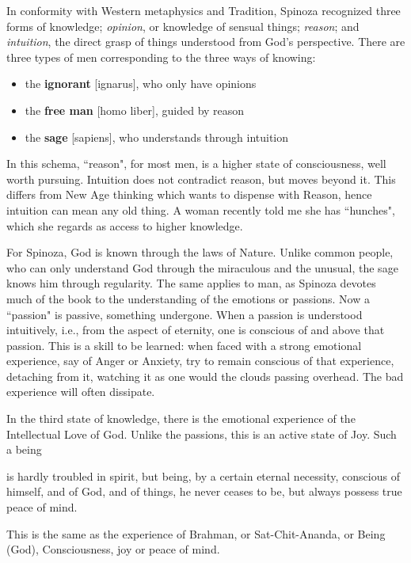 In conformity with Western metaphysics and Tradition, Spinoza recognized three forms of knowledge; \emph{opinion}, or knowledge of sensual things; \emph{reason}; and \emph{intuition}, the direct grasp of things understood from God's perspective. There are three types of men corresponding to the three ways of knowing:

\begin{itemize}
\item the \textbf{ignorant }[ignarus], who only have opinions 
\item the \textbf{free man} [homo liber], guided by reason 
\item the \textbf{sage} [sapiens], who understands through intuition 
\end{itemize}
In this schema, ``reason", for most men, is a higher state of consciousness, well worth pursuing. Intuition does not contradict reason, but moves beyond it. This differs from New Age thinking which wants to dispense with Reason, hence intuition can mean any old thing. A woman recently told me she has ``hunches", which she regards as access to higher knowledge.

For Spinoza, God is known through the laws of Nature. Unlike common people, who can only understand God through the miraculous and the unusual, the sage knows him through regularity. The same applies to man, as Spinoza devotes much of the book to the understanding of the emotions or passions. Now a ``passion" is passive, something undergone. When a passion is understood intuitively, i.e., from the aspect of eternity, one is conscious of and above that passion. This is a skill to be learned: when faced with a strong emotional experience, say of Anger or Anxiety, try to remain conscious of that experience, detaching from it, watching it as one would the clouds passing overhead. The bad experience will often dissipate.

In the third state of knowledge, there is the emotional experience of the Intellectual Love of God. Unlike the passions, this is an active state of Joy. Such a being

\begin{quotex}
is hardly troubled in spirit, but being, by a certain eternal necessity, conscious of himself, and of God, and of things, he never ceases to be, but always possess true peace of mind.

\end{quotex}
This is the same as the experience of Brahman, or Sat-Chit-Ananda, or Being (God), Consciousness, joy or peace of mind.

